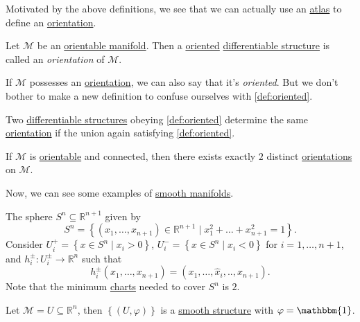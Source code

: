 Motivated by the above definitions, we see that we can actually use an \hyperref[def:atlas]{atlas} to define an \hyperref[def:orientation]{orientation}.

\begin{definition}[Orientation]\label{def:orientation}
	Let \(\mathcal{M} \) be an \hyperref[def:orientable]{orientable manifold}. Then a \hyperref[def:oriented]{oriented} \hyperref[def:smooth-structure]{differentiable structure} is called an \emph{orientation} of \(\mathcal{M} \).
\end{definition}

If \(\mathcal{M} \) possesses an \hyperref[def:orientation]{orientation}, we can also say that it's \emph{oriented}. But we don't bother to make a new definition to confuse ourselves with \autoref{def:oriented}.

\begin{remark}
	Two \hyperref[def:smooth-structure]{differentiable structures} obeying \autoref{def:oriented} determine the same \hyperref[def:orientation]{orientation} if the union again satisfying \autoref{def:oriented}.
\end{remark}

\begin{remark}
	If \(\mathcal{M} \) is \hyperref[def:orientable]{orientable} and connected, then there exists exactly \(2\) distinct \hyperref[def:orientation]{orientations} on \(\mathcal{M} \).
\end{remark}

Now, we can see some examples of \hyperref[def:smooth-manifold]{smooth manifolds}.

\begin{eg}[Sphere]
	The sphere \(S^n \subseteq \mathbb{R} ^{n+1}\) given by
	\[
		S^n = \left\{ (x_1, \dots , x_{n+1} )\in \mathbb{R} ^{n+1} \mid x_1^2 + \dots + x_{n+1}^2 = 1 \right\}.
	\]
	Consider \(U_i^+ = \left\{ x\in S^n \mid x_i > 0 \right\} \), \(U_i^-=\left\{ x\in S^n \mid x_i < 0 \right\} \) for \(i = 1, \dots , n+1\), and \(h_i^{\pm} \colon U_i^{\pm} \to \mathbb{R} ^n\) such that
	\[
		h_i^{\pm}(x_1, \dots , x_{n+1}) = (x_1, \dots , \hat{x} _i, .., x_{n+1}).
	\]
	Note that the minimum \hyperref[def:coordinate-chart]{charts} needed to cover \(S^n\) is \(2\).
\end{eg}

\begin{eg}
	Let \(\mathcal{M} = U \subseteq \mathbb{R} ^n\), then \(\left\{ (U, \varphi ) \right\} \) is a \hyperref[def:smooth-structure]{smooth structure} with \(\varphi = \mathbbm{1}\).
\end{eg}

